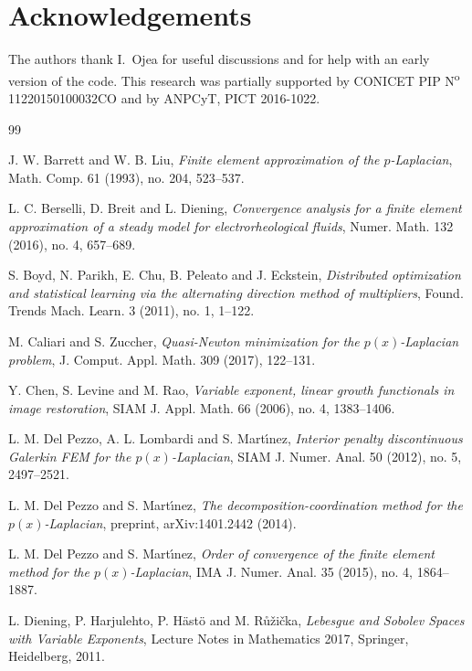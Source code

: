 \documentclass[11pt]{amsart}
\theoremstyle{definition}
\theoremstyle{remark}
\numberwithin{equation}{section}
\begin{document}
\section*{Acknowledgements}
The authors thank I.~Ojea for useful discussions and for help with an early version of the code. This research was partially supported by CONICET PIP N\textsuperscript{o} 11220150100032CO and by ANPCyT, PICT 2016-1022.

\begin{thebibliography}{99}

 {\sc J. W. Barrett and W. B. Liu}, \emph{Finite element approximation of the $p$-Laplacian}, Math. Comp. 61 (1993), no. 204, 523--537.

 {\sc L. C. Berselli, D. Breit and L. Diening}, \emph{Convergence analysis for a finite element approximation of a steady model for electrorheological fluids}, Numer. Math. 132 (2016), no. 4, 657--689.

 {\sc S. Boyd, N. Parikh, E. Chu, B. Peleato and J. Eckstein}, \emph{Distributed optimization and statistical learning via the alternating direction method of multipliers}, Found. Trends Mach. Learn. 3 (2011), no. 1, 1--122.

 {\sc M. Caliari and S. Zuccher}, \emph{Quasi-Newton minimization for the $p(x)$-Laplacian problem}, J. Comput. Appl. Math. 309 (2017), 122--131.

 {\sc Y. Chen, S. Levine and M. Rao}, \emph{Variable exponent, linear growth functionals in image restoration}, SIAM J. Appl. Math. 66 (2006), no. 4, 1383--1406.

 {\sc L. M. Del Pezzo, A. L. Lombardi and S. Mart\'{\i}nez}, \emph{Interior penalty discontinuous Galerkin FEM for the $p(x)$-Laplacian}, SIAM J. Numer. Anal. 50 (2012), no. 5, 2497--2521.

 {\sc L. M. Del Pezzo and S. Mart\'{\i}nez}, \emph{The decomposition-coordination method for the $p(x)$-Laplacian}, preprint, arXiv:1401.2442 (2014).

 {\sc L. M. Del Pezzo and S. Mart\'{\i}nez}, \emph{Order of convergence of the finite element method for the $p(x)$-Laplacian}, IMA J. Numer. Anal. 35 (2015), no. 4, 1864--1887.

 {\sc L. Diening, P. Harjulehto, P. H\"ast\"o and M. R\r{u}\v{z}i\v{c}ka}, \emph{Lebesgue and Sobolev Spaces with Variable Exponents}, Lecture Notes in Mathematics 2017, Springer, Heidelberg, 2011.


\end{thebibliography}
\end{document}

